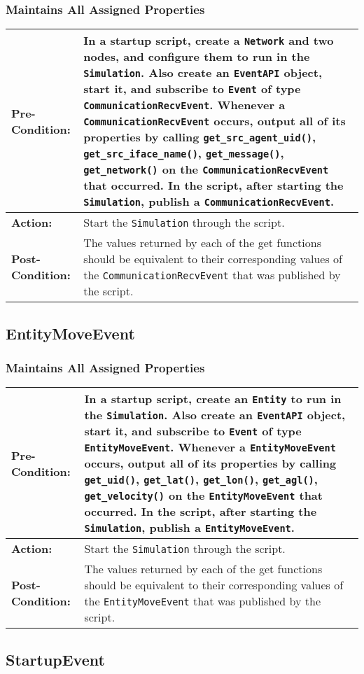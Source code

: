 \documentclass[titlepage]{article}
\newcommand{\testcase}[3]{
    \begin{center}
    \begin{tabular}{| l | p{0.7\textwidth}|}
        \hline
        \rowcolor[gray]{0.8}\textbf{Pre-Condition:} & #1 \\ \hline
        \textbf{Action:} & #2 \\ \hline
        \rowcolor[gray]{0.8}\textbf{Post-Condition:} & #3 \\ \hline
    \end{tabular}
    \end{center}
}
\begin{document}
\subsubsection{Maintains All Assigned Properties}
\testcase{In a startup script, create a \texttt{Network} and two nodes, and configure them to run in the \texttt{Simulation}. Also create an \texttt{EventAPI} object, start it, and subscribe to \texttt{Event} of type \texttt{CommunicationRecvEvent}. Whenever a \texttt{CommunicationRecvEvent} occurs, output all of its properties by calling \texttt{get\_src\_agent\_uid()}, \texttt{get\_src\_iface\_name()}, \texttt{get\_message()}, \texttt{get\_network()} on the \texttt{CommunicationRecvEvent} that occurred. In the script, after starting the \texttt{Simulation}, publish a \texttt{CommunicationRecvEvent}.}{Start the \texttt{Simulation} through the script.}{The values returned by each of the get functions should be equivalent to their corresponding values of the \texttt{CommunicationRecvEvent} that was published by the script.}

\subsection{EntityMoveEvent}
\subsubsection{Maintains All Assigned Properties}
\testcase{In a startup script, create an \texttt{Entity} to run in the \texttt{Simulation}. Also create an \texttt{EventAPI} object, start it, and subscribe to \texttt{Event} of type \texttt{EntityMoveEvent}. Whenever a \texttt{EntityMoveEvent} occurs, output all of its properties by calling \texttt{get\_uid()}, \texttt{get\_lat()}, \texttt{get\_lon()}, \texttt{get\_agl()}, \texttt{get\_velocity()} on the \texttt{EntityMoveEvent} that occurred. In the script, after starting the \texttt{Simulation}, publish a \texttt{EntityMoveEvent}.}{Start the \texttt{Simulation} through the script.}{The values returned by each of the get functions should be equivalent to their corresponding values of the \texttt{EntityMoveEvent} that was published by the script.}

\subsection{StartupEvent}
\end{document}
